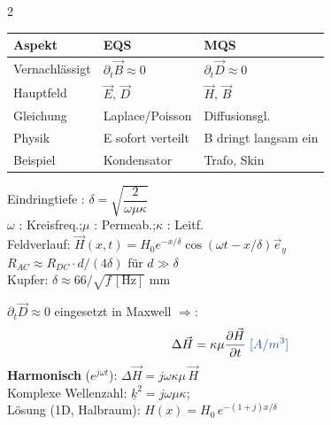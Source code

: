 \documentclass[a4paper, 7.5pt]{extarticle}
\begin{document}
\begin{multicols*}{2}
\begin{tcolorbox}[title={EQS vs. MQS -- Vergleich}]
\begin{tabular}{@{}lll@{}}
\toprule
Aspekt & \textbf{EQS} & \textbf{MQS}\\
\midrule
Vernachlässigt & $\partial_t\vec{B}\approx0$ & $\partial_t\vec{D}\approx0$\\
Hauptfeld & $\vec{E}$, $\vec{D}$ & $\vec{H}$, $\vec{B}$\\
Gleichung & Laplace/Poisson & Diffusionsgl.\\
Physik & E sofort verteilt & B dringt langsam ein\\
Beispiel & Kondensator & Trafo, Skin\\
\bottomrule
\end{tabular}
\end{tcolorbox}

\begin{tcolorbox}[title={Skin-Effekt \& Eindringtiefe}]
\begin{center}
\end{center}
Eindringtiefe \;\text{\textcolor{boxtitle}{[\(m\)]}}: $\delta = \sqrt{\dfrac{2}{\omega\mu\kappa}}$\\
$\omega$ \;\text{\textcolor{boxtitle}{[\(rad/s\)]}}: Kreisfreq.;\quad $\mu$ \;\text{\textcolor{boxtitle}{[\(H/m\)]}}: Permeab.;\quad $\kappa$ \;\text{\textcolor{boxtitle}{[\(S/m\)]}}: Leitf.\\[3pt]
Feldverlauf: $\vec{H}(x,t)=H_0 e^{-x/\delta}\cos(\omega t-x/\delta)\vec{e}_y$\\
$R_{AC}\approx R_{DC}\cdot d/(4\delta)$ \quad für $d\gg\delta$\\
Kupfer: $\delta\approx 66/\sqrt{f\,[\text{Hz}]}$ mm
\end{tcolorbox}

\begin{tcolorbox}[title={Diffusionsgleichung (MQS)}]
$\partial_t\vec{D}\approx0$ eingesetzt in Maxwell $\Rightarrow$:
$$\Delta\vec{H} = \kappa\mu\frac{\partial\vec{H}}{\partial t} \;\text{\textcolor{boxtitle}{[\(A/m^3\)]}}$$
\textbf{Harmonisch} ($e^{j\omega t}$): $\Delta\vec{H} = j\omega\kappa\mu\,\vec{H}$\\
Komplexe Wellenzahl: $\underline{k}^2 = j\omega\mu\kappa$;\\
Lösung (1D, Halbraum): $H(x) = H_0\,e^{-(1+j)x/\delta}$
\end{tcolorbox}


\end{multicols*}
\end{document}
